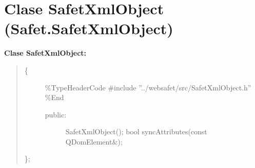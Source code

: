 \documentclass[letterpaper,11pt,spanish]{sphinxmanual}
\begin{document}
\chapter{Clase SafetXmlObject (Safet.SafetXmlObject)}
\label{_templates/Contenido5/Clase2:clase-safetxmlobject-safet-safetxmlobject}\label{_templates/Contenido5/Clase2::doc}
\textbf{Clase SafetXmlObject:}
\begin{quote}
\begin{description}
\item[{\{}] \leavevmode
\%TypeHeaderCode
\#include ''../websafet/src/SafetXmlObject.h''
\%End
\begin{description}
\item[{public:}] \leavevmode
SafetXmlObject();
bool syncAttributes(const QDomElement\&);

\end{description}

\end{description}

\};
\end{quote}
\end{document}
